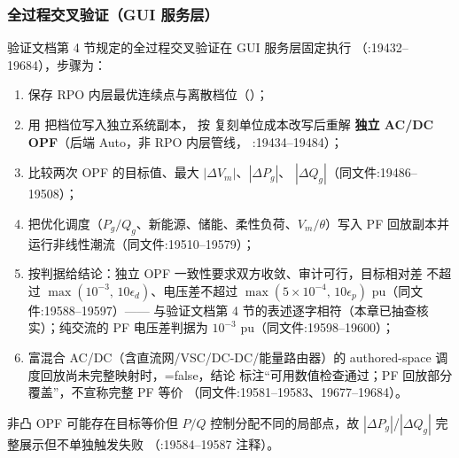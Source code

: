 \subsubsection*{全过程交叉验证（GUI 服务层）}
验证文档第 4 节规定的全过程交叉验证在 GUI 服务层固定执行
（:19432--19684），步骤为：
\begin{enumerate}
  \item 保存 RPO 内层最优连续点与离散档位（）；
  \item 用  把档位写入独立系统副本，
        按  复刻单位成本改写后重解
        \textbf{独立 AC/DC OPF}（后端 Auto，非 RPO 内层管线，
        :19434--19484）；
  \item 比较两次 OPF 的目标值、最大 $|\Delta V_m|$、$|\Delta P_g|$、
        $|\Delta Q_g|$（同文件:19486--19508）；
  \item 把优化调度（$P_g/Q_g$、新能源、储能、柔性负荷、$V_m/\theta$）写入
        PF 回放副本并运行非线性潮流（同文件:19510--19579）；
  \item 按判据给结论：独立 OPF 一致性要求双方收敛、审计可行，目标相对差
        不超过 $\max(10^{-3},\,10\epsilon_d)$、电压差不超过
        $\max(5\times10^{-4},\,10\epsilon_p)$ pu（同文件:19588--19597）——
        与验证文档第 4 节的表述逐字相符（本章已抽查核实）；纯交流的 PF
        电压差判据为 $10^{-3}$ pu（同文件:19598--19600）；
  \item 富混合 AC/DC（含直流网/VSC/DC-DC/能量路由器）的 authored-space
        调度回放尚未完整映射时，=false，结论
        标注“可用数值检查通过；PF 回放部分覆盖”，不宣称完整 PF 等价
        （同文件:19581--19583、19677--19684）。
\end{enumerate}
非凸 OPF 可能存在目标等价但 $P/Q$ 控制分配不同的局部点，故
$|\Delta P_g|$/$|\Delta Q_g|$ 完整展示但不单独触发失败
（:19584--19587 注释）。

